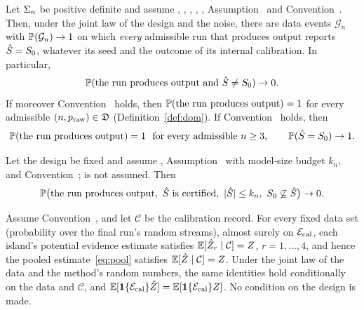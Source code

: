 
\begin{mainthm}\label{thm:reported}
Let $\Sig$ be positive definite and assume , , , , , Assumption~
and Convention~. Then, under the joint law of the design and the noise, there are data events $\mathcal G_n$ with
$\P(\mathcal G_n)\to1$ on which \emph{every} admissible run that produces output reports $\Shat=\Sz$, whatever its seed and
the outcome of its internal calibration. In particular,
\begin{equation}\label{eq:reported}
  \P(\text{the run produces output and }\Shat\neq\Sz)\to0 .
\end{equation}
If moreover Convention~ holds, then $\P(\text{the run produces output})=1$ for every admissible $(n,\praw)\in\Dom$
(Definition~\ref{def:dom}). If Convention~ holds, then
\begin{equation}\label{eq:delivery}
  \P(\text{the run produces output})=1\ \ \text{for every admissible }n\ge3,\qquad \P(\Shat=\Sz)\to1 .
\end{equation}
\end{mainthm}


\begin{mainthm}\label{thm:screen}
Let the design be fixed and assume , Assumption~ with model-size budget $k_n$, and Convention~;
 is not assumed. Then
\[
  \P\big(\text{the run produces output},\ \Shat\text{ is certified},\ \abs{\Shat}\le k_n,\ \Sz\not\subseteq\Shat\big)\to0 .
\]
\end{mainthm}


\begin{mainprop}\label{prop:unbiased}
Assume Convention~, and let $\mathcal C$ be the calibration record. For every fixed data set (probability over the
final run's random streams), almost surely on $\Acal$, each island's potential evidence estimate satisfies
$\E[\Zhat_r\mid\mathcal C]=Z$, $r=1,\dots,4$, and hence the pooled estimate~\eqref{eq:pool} satisfies
$\E[\Zhat\mid\mathcal C]=Z$. Under the joint law of the data and the method's random numbers, the same identities hold
conditionally on the data and $\mathcal C$, and $\E[\ind{\Acal}\Zhat]=\E[\ind{\Acal}Z]$. No condition on the design is
made.
\end{mainprop}

